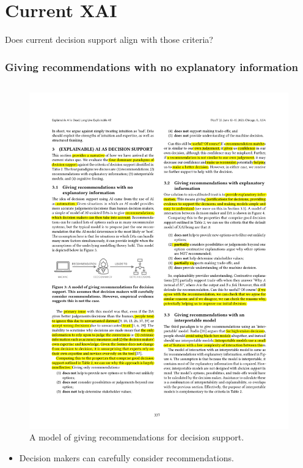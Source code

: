 \documentclass[compress,12pt]{beamer}
\begin{document}
\section{Current XAI}

\begin{frame}[standout]
      \centering\large
      Does current decision support align with those criteria?
\end{frame}

\begin{frame}
      \frametitle{Giving recommendations with no explanatory information}
      \begin{columns}[T] %
            \begin{column}{.75\textwidth}
                  \begin{figure}[htbp]
                        \centering
                        \includegraphics[width=.9\textwidth]{fig3.pdf}
                        \caption{ A model of giving recommendations for decision support.}
                  \end{figure}
                  \begin{itemize}
                        \item [] Decision makers can carefully consider recommendations.

\end{itemize}
\end{column}
\end{columns}
\end{frame}
\end{document}
